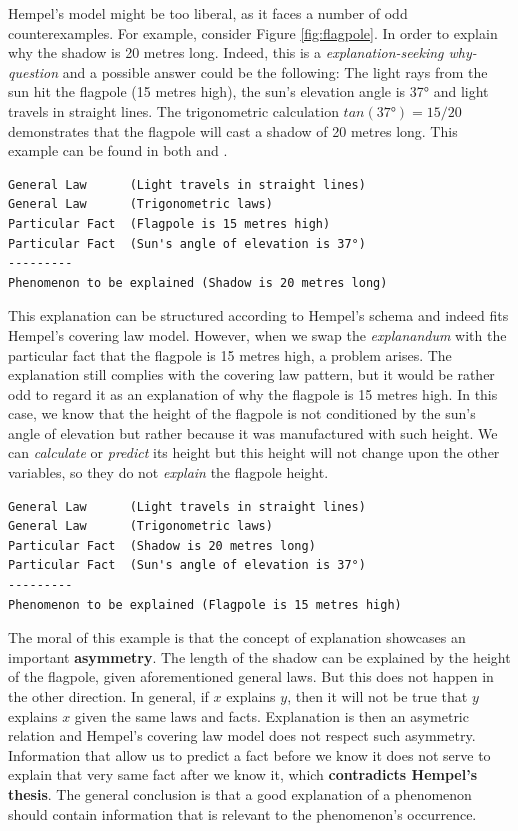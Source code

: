 \documentclass[
]{book}
\begin{document}
Hempel's model might be too liberal, as it faces a number of odd counterexamples. For example, consider Figure \ref{fig:flagpole}. In order to explain why the shadow is 20 metres long. Indeed, this is a \emph{explanation-seeking why-question} and a possible answer could be the following: The light rays from the sun hit the flagpole (15 metres high), the sun's elevation angle is 37° and light travels in straight lines. The trigonometric calculation \(tan(37°) = 15/20\) demonstrates that the flagpole will cast a shadow of 20 metres long. This example can be found in both \citep{rosenberg2019philosophy} and \citep{okasha-pos}.

\begin{verbatim}
General Law      (Light travels in straight lines)
General Law      (Trigonometric laws)
Particular Fact  (Flagpole is 15 metres high)
Particular Fact  (Sun's angle of elevation is 37°)
---------
Phenomenon to be explained (Shadow is 20 metres long)
\end{verbatim}

This explanation can be structured according to Hempel's schema and indeed fits Hempel's covering law model. However, when we swap the \emph{explanandum} with the particular fact that the flagpole is 15 metres high, a problem arises. The explanation still complies with the covering law pattern, but it would be rather odd to regard it as an explanation of why the flagpole is 15 metres high. In this case, we know that the height of the flagpole is not conditioned by the sun's angle of elevation but rather because it was manufactured with such height. We can \emph{calculate} or \emph{predict} its height but this height will not change upon the other variables, so they do not \emph{explain} the flagpole height.

\begin{verbatim}
General Law      (Light travels in straight lines)
General Law      (Trigonometric laws)
Particular Fact  (Shadow is 20 metres long)
Particular Fact  (Sun's angle of elevation is 37°)
---------
Phenomenon to be explained (Flagpole is 15 metres high)
\end{verbatim}

The moral of this example is that the concept of explanation showcases an important \textbf{asymmetry}. The length of the shadow can be explained by the height of the flagpole, given aforementioned general laws. But this does not happen in the other direction. In general, if \(x\) explains \(y\), then it will not be true that \(y\) explains \(x\) given the same laws and facts. Explanation is then an asymetric relation and Hempel's covering law model does not respect such asymmetry. Information that allow us to predict a fact before we know it does not serve to explain that very same fact after we know it, which \textbf{contradicts Hempel's thesis}.
The general conclusion is that a good explanation of a phenomenon should contain information that is relevant to the phenomenon's occurrence.
\end{document}
